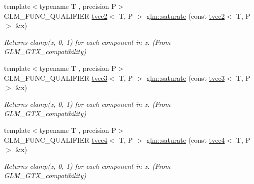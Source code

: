\begin{DoxyCompactItemize}
\mbox{\label{group__gtx__compatibility_ga5815a26488231dfdf92242cf0c2d2107}} 
{\footnotesize template$<$typename T , precision P$>$ }\\G\+L\+M\+\_\+\+F\+U\+N\+C\+\_\+\+Q\+U\+A\+L\+I\+F\+I\+ER \hyperlink{structglm_1_1tvec2}{tvec2}$<$ T, P $>$ \hyperlink{group__gtx__compatibility_ga5815a26488231dfdf92242cf0c2d2107}{glm\+::saturate} (const \hyperlink{structglm_1_1tvec2}{tvec2}$<$ T, P $>$ \&x)
\begin{DoxyCompactList}\small\item\em Returns clamp(x, 0, 1) for each component in x. (From G\+L\+M\+\_\+\+G\+T\+X\+\_\+compatibility) \end{DoxyCompactList}\item 
\mbox{\label{group__gtx__compatibility_ga02ed1a53c6df104d56b69f8fb5e9af1b}} 
{\footnotesize template$<$typename T , precision P$>$ }\\G\+L\+M\+\_\+\+F\+U\+N\+C\+\_\+\+Q\+U\+A\+L\+I\+F\+I\+ER \hyperlink{structglm_1_1tvec3}{tvec3}$<$ T, P $>$ \hyperlink{group__gtx__compatibility_ga02ed1a53c6df104d56b69f8fb5e9af1b}{glm\+::saturate} (const \hyperlink{structglm_1_1tvec3}{tvec3}$<$ T, P $>$ \&x)
\begin{DoxyCompactList}\small\item\em Returns clamp(x, 0, 1) for each component in x. (From G\+L\+M\+\_\+\+G\+T\+X\+\_\+compatibility) \end{DoxyCompactList}\item 
\mbox{\label{group__gtx__compatibility_ga63791409bdef9745b956406afe3157f1}} 
{\footnotesize template$<$typename T , precision P$>$ }\\G\+L\+M\+\_\+\+F\+U\+N\+C\+\_\+\+Q\+U\+A\+L\+I\+F\+I\+ER \hyperlink{structglm_1_1tvec4}{tvec4}$<$ T, P $>$ \hyperlink{group__gtx__compatibility_ga63791409bdef9745b956406afe3157f1}{glm\+::saturate} (const \hyperlink{structglm_1_1tvec4}{tvec4}$<$ T, P $>$ \&x)
\begin{DoxyCompactList}\small\item\em Returns clamp(x, 0, 1) for each component in x. (From G\+L\+M\+\_\+\+G\+T\+X\+\_\+compatibility) \end{DoxyCompactList}\item 
\mbox{\label{group__gtx__compatibility_gac63011205bf6d0be82589dc56dd26708}} 

\end{DoxyCompactItemize}
